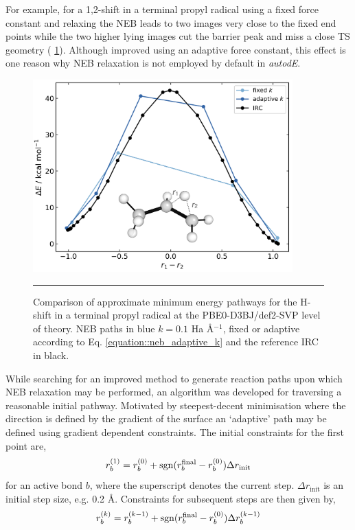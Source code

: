 \documentclass[../../main.tex]{subfiles}
\begin{document}
For example, for a 1,2-shift in a terminal propyl radical using a fixed force constant and relaxing the NEB leads to two images very close to the fixed end points while the two higher lying images cut the barrier peak and miss a close TS geometry (\figurename{ \ref{fig::ade_further_1}}). Although improved using an adaptive force constant, this effect is one reason why NEB relaxation is not employed by default in \emph{autodE}.

\begin{figure}[h!]
	\vspace{0.4cm}
	\centering
	\includegraphics[width=10cm]{5/further/figs/fig1/fig1.png}
	\vspace{0.4cm}
	\hrule
	\caption{Comparison of approximate minimum energy pathways for the H-shift in a terminal propyl radical at the PBE0-D3BJ/def2-SVP level of theory. NEB paths in blue $k = 0.1$ Ha \AA$^{-1}$, fixed or adaptive according to Eq. \eqref{equation::neb_adaptive_k} and the reference IRC in black.}
	\label{fig::ade_further_1}
\end{figure}


While searching for an improved method to generate reaction paths upon which NEB relaxation may be performed, an algorithm was developed for traversing a reasonable initial pathway. Motivated by steepest-decent minimisation where the direction is defined by the gradient of the surface an `adaptive' path may be defined using gradient dependent constraints. The initial constraints for the first point are,
\begin{equation}
	r_b^{(1)} = r_b^{(0)} + \operatorname{sgn}(r_b^\text{final} - r_b^{(0)})\Delta r_\text{init}
\end{equation}
for an active bond $b$, where the superscript denotes the current step. $\Delta r_\text{init}$ is an initial step size, e.g. 0.2 \AA. Constraints for subsequent steps are then given by,
\begin{equation}
	r_b^{(k)} = r_b^{(k-1)} + \operatorname{sgn}(r_b^\text{final} - r_b^{(0)})\Delta r_b^{(k-1)}
\end{equation}
\end{document}
